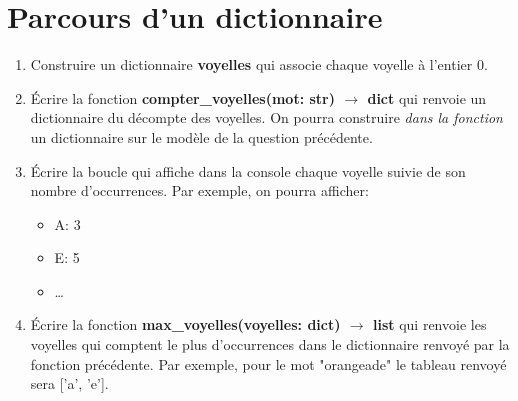 \documentclass[a4paper,11pt]{article}
\begin{document}
\section{Parcours d'un dictionnaire}
\begin{enumerate}
    \item Construire un dictionnaire \textbf{voyelles} qui associe chaque voyelle à l'entier 0.
    \item Écrire la fonction \textbf{compter\_voyelles(mot: str) $\rightarrow$ dict} qui renvoie un dictionnaire du décompte des voyelles. On pourra construire \emph{dans la fonction} un dictionnaire sur le modèle de la question précédente.
    \item Écrire la boucle qui affiche dans la console chaque voyelle suivie de son nombre d'occurrences. Par exemple, on pourra afficher:
    \begin{itemize}
        \item A: 3
        \item E: 5
        \item \dots
    \end{itemize}
    \item Écrire la fonction \textbf{max\_voyelles(voyelles: dict) $\rightarrow$ list} qui renvoie les voyelles qui comptent le plus d'occurrences dans le dictionnaire renvoyé par la fonction précédente. Par exemple, pour le mot "orangeade" le tableau renvoyé sera ['a', 'e'].
\end{enumerate}
\end{document}
